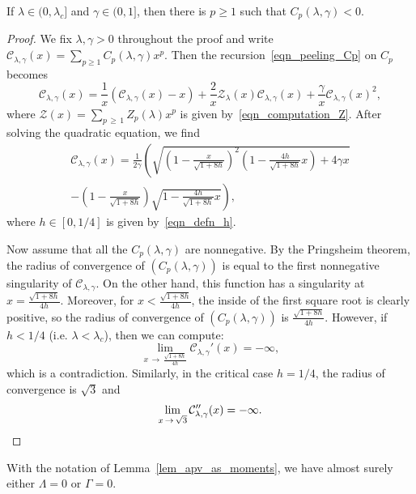 \documentclass[10pt]{amsart}
\theoremstyle{definition}\newtheorem{defi}[theo]{Definition}\newtheorem{rema}[theo]{Remark}\newtheorem{exam}[theo]{Example}\newtheorem{exem}[theo]{Example}\newtheorem{nota}[theo]{Notation}
\newcommand{\clZ}{\mathcal{Z}}
\newcommand{\clC}{\mathcal{C}}
\begin{document}
\begin{prop}\label{prop_cnegative_deterministic}
If $\lambda \in (0,\lambda_c]$ and $\gamma \in (0,1]$, then there is $p \geq 1$ such that $C_p(\lambda,\gamma) <0$.
\end{prop}

\begin{proof}
We fix $\lambda, \gamma>0$ throughout the proof and write $\clC_{\lambda, \gamma}(x)=\sum_{p \geq 1} C_p(\lambda,\gamma) x^p$. Then the recursion~\eqref{eqn_peeling_Cp} on $C_p$ becomes
\begin{equation}\label{eqn_genfunction_Cp}
\clC_{\lambda, \gamma}(x)=\frac{1}{x} \left(\clC_{\lambda, \gamma}(x)-x \right) + \frac{2}{x} \clZ_{\lambda}(x) \clC_{\lambda, \gamma}(x) + \frac{\gamma}{x} \clC_{\lambda, \gamma}(x)^2,
\end{equation}
where $\clZ(x)=\sum_{p\,\geq\,1} Z_p(\lambda) x^p$ is given by~\eqref{eqn_computation_Z}. After solving the quadratic equation, we find
\begin{multline}
\clC_{\lambda, \gamma}(x)=\frac{1}{2\gamma} \left(\sqrt{\left(1-\frac{x}{\sqrt{1+8h}} \right)^2 \left(1-\frac{4h}{\sqrt{1+8h}}x \right) +4\gamma x}\right.\\ 
\left. -\left(1-\frac{x}{\sqrt{1+8h}} \right) \sqrt{1-\frac{4h}{\sqrt{1+8h}}x} \right),
\end{multline}
where $h \in [0,1/4]$ is given by~\eqref{eqn_defn_h}.

Now assume that all the $C_p(\lambda, \gamma)$ are nonnegative. By the Pringsheim theorem, the radius of convergence of $(C_p(\lambda,\gamma))$ is equal to the first nonnegative singularity of $\clC_{\lambda,\gamma}$. On the other hand, this function has a singularity at $x=\frac{\sqrt{1+8h}}{4h}$. Moreover, for $x < \frac{\sqrt{1+8h}}{4h}$, the inside of the first square root is clearly positive, so the radius of convergence of $(C_p(\lambda, \gamma) )$ is $\frac{\sqrt{1+8h}}{4h}$. However, if $h<1/4$ (i.e. $\lambda<\lambda_c$), then we can compute:
\[
\lim_{x\,\to\,\frac{\sqrt{1+8h}}{4h}} \clC_{\lambda,\gamma}'(x) = -\infty,
\]
which is a contradiction. Similarly, in the critical case $h=1/4$, the radius of convergence is $\sqrt{3}$ and
\[
\lim_{x\,\to\,\sqrt{3}} \clC_{\lambda,\gamma}''(x) = -\infty.\qedhere
\]
\end{proof}

\begin{prop}\label{prop_cnegative_random}
With the notation of Lemma~\ref{lem_apv_as_moments}, we have almost surely either $\Lambda=0$ or $\Gamma=0$.
\end{prop}
\end{document}
